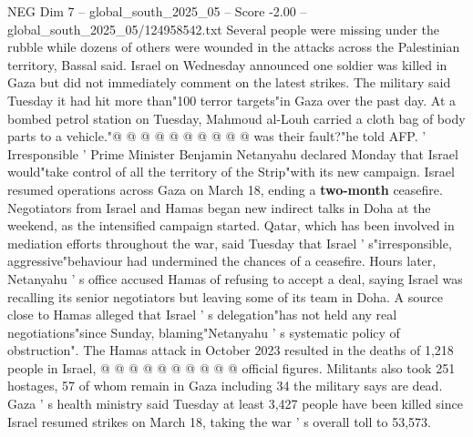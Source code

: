 \begin{textsample}{NEG Dim 7 – global\_south\_2025\_05 – Score -2.00 – global\_south\_2025\_05/124958542.txt}
Several people were missing under the rubble while dozens of others were wounded in the attacks across the Palestinian territory, Bassal said.
Israel on Wednesday announced one soldier was killed in Gaza but did not immediately comment on the latest strikes.
The military said Tuesday it had hit more than"100 terror targets"in Gaza over the past day.
At a bombed petrol station on Tuesday, Mahmoud al-Louh carried a cloth bag of body parts to a vehicle."@ @ @ @ @ @ @ @ @ @ was their fault?"he told AFP. ' Irresponsible ' Prime Minister Benjamin Netanyahu declared Monday that Israel would"take control of all the territory of the Strip"with its new campaign.
Israel resumed operations across Gaza on March 18, ending a \textbf{two-month} ceasefire.
Negotiators from Israel and Hamas began new indirect talks in Doha at the weekend, as the intensified campaign started.
Qatar, which has been involved in mediation efforts throughout the war, said Tuesday that Israel ' s"irresponsible, aggressive"behaviour had undermined the chances of a ceasefire.
Hours later, Netanyahu ' s office accused Hamas of refusing to accept a deal, saying Israel was recalling its senior negotiators but leaving some of its team in Doha.
A source close to Hamas alleged that Israel ' s delegation"has not held any real negotiations"since Sunday, blaming"Netanyahu ' s systematic policy of obstruction".
The Hamas attack in October 2023 resulted in the deaths of 1,218 people in Israel, @ @ @ @ @ @ @ @ @ @ official figures.
Militants also took 251 hostages, 57 of whom remain in Gaza including 34 the military says are dead.
Gaza ' s health ministry said Tuesday at least 3,427 people have been killed since Israel resumed strikes on March 18, taking the war ' s overall toll to 53,573.

\end{textsample}
